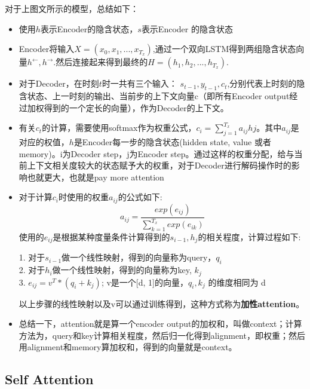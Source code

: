 \documentclass[UTF8,a4paper,10pt]{ctexart}
\begin{document}
      对于上图文所示的模型，总结如下：
      \begin{itemize}
        \item  使用$h$表示Encoder的隐含状态，$s​$表示Encoder 的隐含状态
         
        \item Encoder将输入$X = (x_0, x_1, ...,x_{T_x})$,通过一个双向LSTM得到两组隐含状态向量$h^{\leftarrow}, h^{\rightarrow}$.然后连接起来得到最终的$H=(h_1,h_2, ...,h_{T_x})$.

        \item 对于Decoder，在时刻$t$时一共有三个输入： $s_{t-1}, y_{t-1}, c_t$,分别代表上时刻的隐含状态、上一时刻的输出、当前步的上下文向量c（即所有Encoder output经过加权得到的一个定长的向量），作为Decoder的上下文。

        \item 有关$c_t$的计算，需要使用softmax作为权重公式，$c_i = \sum_{j=1}^{T_x}a_{ij}h{j}$。其中$a_{ij}$是对应的权值，$h$是Encoder每一步的隐含状态(hidden state, value 或者memory)。i为Decoder step，j为Encoder step。通过这样的权重分配，给与当前上下文相关度较大的状态赋予大的权重，对于Decoder进行解码操作时的影响也就更大，也就是pay more attention

        \item 对于计算$c_i$时使用的权重$a_{ij}$的公式如下:
  $$
              a_{ij} = \frac{exp(e_{ij})}{\sum_{k=1}^{T_x}{exp(e_{ik})}}
  $$
            使用的$e_{ij}$是根据某种度量条件计算得到的$s_{i-1},h_j$的相关程度，计算过程如下:
            \begin{tcolorbox}
               1. 对于$s_{i-1}$做一个线性映射，得到的向量称为query，$q_i$
               \\ 2. 对于$h_i$做一个线性映射，得到的向量称为key, $k_j$
               \\ 3. $e_{ij} = v^T * (q_i + k_j)$; v是一个[d, 1]的向量，$q_i, k_j$ 的维度相同为 d
              \end{tcolorbox}
              以上步骤的线性映射以及v可以通过训练得到，这种方式称为\textbf{加性attention}。

          \item 总结一下，attention就是算一个encoder output的加权和，叫做context；计算方法为，query和key计算相关程度，然后归一化得到alignment，即权重；然后用alignment和memory算加权和，得到的向量就是context。
      \end{itemize}

    \subsection{\textbf{Self Attention}}
\end{document}
